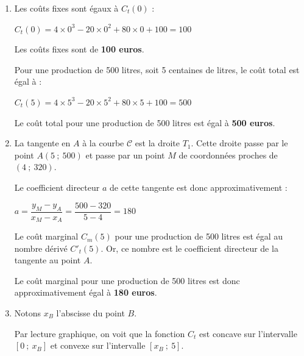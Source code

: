 \begin{corrige}
     \par
     \begin{enumerate}
          \item %
          Les coûts fixes sont égaux à $C_t(0)$ :
          \par
          $C_t(0)=4 \times 0^3 -20 \times 0^2 + 80 \times 0 + 100 = 100$
          \par
          Les coûts fixes sont de \textbf{100 euros}.
          \par
          Pour une production de 500 litres, soit 5 centaines de litres, le coût total est égal à :
          \par
          $C_t(5)=4 \times 5^3 -20 \times 5^2 + 80 \times 5 + 100 = 500$
          \par
          Le coût total pour une production de 500 litres est égal à \textbf{500 euros}.
          \item %
          La tangente en $A$ à la courbe $\mathscr{C}$ est la droite $T_1$. Cette droite passe par le point $A(5~;~500)$ et passe par un point $M$ de coordonnées proches de $(4~;~320)$.
          \par
          Le coefficient directeur $a$ de cette tangente est donc approximativement :
          \par
          $a=\dfrac{y_M-y_A}{x_M-x_A}=\dfrac{500-320}{5-4}=180$
          \par
          Le coût marginal $C_m(5)$ pour une production de 500 litres est égal au nombre dérivé $C'_t(5)$. Or, ce nombre est le coefficient directeur de la tangente au point $A$.
          \par
          \par
          Le coût marginal pour une production de 500 litres est donc approximativement égal à \textbf{180 euros}.
          \item %
          Notons $x_B$ l'abscisse du point $B$.
          \par
          Par lecture graphique, on voit que la fonction $C_t$ est concave sur l'intervalle $[0~;~x_B]$ et convexe sur l'intervalle $[x_B~;~5]$.

\end{enumerate}
\end{corrige}
